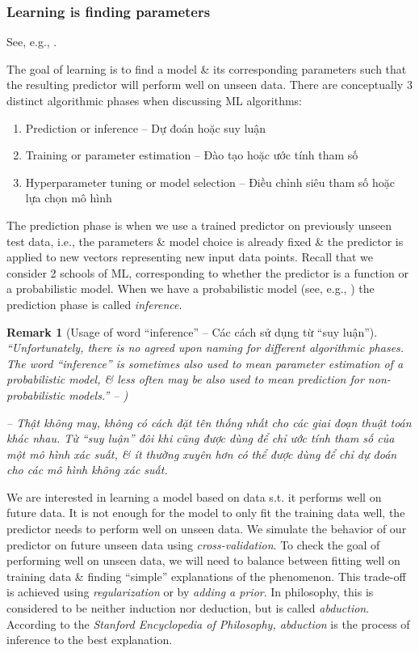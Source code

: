 \documentclass{article}
\newtheorem{remark}{Remark}
\begin{document}
\subsubsection{Learning is finding parameters}
See, e.g., \cite[Chap. 8, Sect. 8.1.4: Learning is Finding Parameters]{Deisenroth_Faisal_Ong2024}.

The goal of learning is to find a model \& its corresponding parameters such that the resulting predictor will perform well on unseen data. There are conceptually 3 distinct algorithmic phases when discussing ML algorithms:
\begin{enumerate}
	\item Prediction or inference -- Dự đoán hoặc suy luận
	\item Training or parameter estimation -- Đào tạo hoặc ước tính tham số
	\item Hyperparameter tuning or model selection -- Điều chỉnh siêu tham số hoặc lựa chọn mô hình
\end{enumerate}
The prediction phase is when we use a trained predictor on previously unseen test data, i.e., the parameters \& model choice is already fixed \& the predictor is applied to new vectors representing new input data points. Recall that we consider 2 schools of ML, corresponding to whether the predictor is a function or a probabilistic model. When we have a probabilistic model (see, e.g., \cite[Sect. 8.4]{Deisenroth_Faisal_Ong2024}) the prediction phase is called {\it inference}.

\begin{remark}[Usage of word ``inference'' -- Các cách sử dụng từ ``suy luận'']
	``Unfortunately, there is no agreed upon naming for different algorithmic phases. The word ``inference'' is sometimes also used to mean parameter estimation of a probabilistic model, \& less often may be also used to mean prediction for non-probabilistic models.'' -- \cite[Rmk, p. 257]{Deisenroth_Faisal_Ong2024})
	
	-- Thật không may, không có cách đặt tên thống nhất cho các giai đoạn thuật toán khác nhau. Từ ``suy luận'' đôi khi cũng được dùng để chỉ ước tính tham số của một mô hình xác suất, \& ít thường xuyên hơn có thể được dùng để chỉ dự đoán cho các mô hình không xác suất.
\end{remark}
We are interested in learning a model based on data s.t. it performs well on future data. It is not enough for the model to only fit the training data well, the predictor needs to perform well on unseen data. We simulate the behavior of our predictor on future unseen data using {\it cross-validation}. To check the goal of performing well on unseen data, we will need to balance between fitting well on training data \& finding ``simple'' explanations of the phenomenon. This trade-off is achieved using {\it regularization} or by {\it adding a prior}. In philosophy, this is considered to be neither induction nor deduction, but is called {\it abduction}. According to the {\it Stanford Encyclopedia of Philosophy, abduction} is the process of inference to the best explanation.
\end{document}

